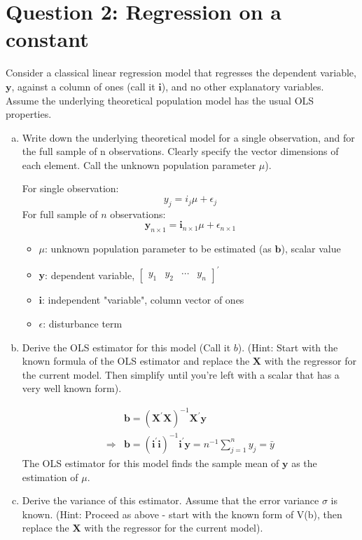 \documentclass[11pt,reqno]{article}   %
\newcommand{\mlt}[1]{\mathbf{#1}} %
\newcommand{\kl}{\left(}
\newcommand{\kr}{\right)}
\newcommand{\kt}{^{\prime}}
\newcommand{\keps}{\epsilon}
\newcommand{\kX}{\mlt{X}}
\newcommand{\ky}{\mlt{y}}
\newcommand{\kb}{\mlt{b}}
\newcommand{\ki}{\mlt{i}}
\begin{document}
\section*{Question 2: Regression on a constant}
Consider a classical linear regression model that regresses the dependent variable, $\ky$,
against a column of ones (call it $\ki$), and no other explanatory variables.
Assume the underlying theoretical population model has the usual OLS properties.

\begin{enumerate}[(a)]
\item
Write down the underlying theoretical model for a single observation, and for the full sample of n observations.
Clearly specify the vector dimensions of each element.  Call the unknown population parameter $\mu$).

For single observation:
\begin{equation}
y_j = i_j\mu + \epsilon_j
\end{equation}
For full sample of $n$ observations:
\begin{equation}
\ky_{n\times 1} = \mlt{i}_{n\times 1}\mu + \keps_{n\times 1}
\end{equation}

\begin{itemize}
        \item $\mu$: unknown population parameter to be estimated (as $\kb$), scalar value
        \item $\ky$: dependent variable, $\left[\begin{array}{llll}{y_{1}} & {y_{2}} &{\cdots} & {y_{n}}\end{array}\right]\kt$
        \item $\mlt{i}$: independent "variable", column vector of ones
        \item $\keps$: disturbance term
\end{itemize}

\item
Derive the OLS estimator for this model (Call it $b$).
(Hint: Start with the known formula of the OLS estimator and replace the $\kX$
with the regressor for the current model.
Then simplify until you're left with a scalar that has a very well known form).

\begin{equation}
\begin{split}
& \kb = \kl \kX\kt\kX \kr^{-1}\kX\kt\ky \\
\Rightarrow & \kb = \kl \mlt{i}\kt\mlt{i} \kr^{-1}\mlt{i}\kt\ky = n^{-1}\sum^n_{j=1}y_j = \bar{y}
\end{split}
\end{equation}
The OLS estimator for this model finds the sample mean of $\ky$ as the estimation of $\mu$.
\item
Derive the variance of this estimator. Assume that the error variance $\sigma$ is known.
(Hint: Proceed as above - start with the known form of V(b), then replace the $\kX$ with
the regressor for the current model).


\end{enumerate}
\end{document}
